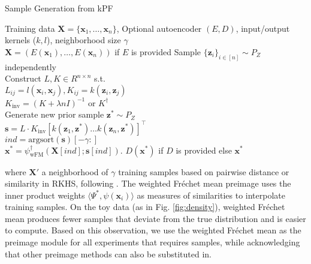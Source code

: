 \begin{wraptable}{r}{0.5\textwidth}
    \vspace{-2em}
    \begin{minipage}{0.5\textwidth}
        \begin{algorithm}[H]
        \footnotesize
        \caption{Sample Generation from kPF}
        \label{alg:gen_algo}
        \begin{algorithmic}[1]
        
            Training data $\mathbf{X} = \{\mathbf{x}_1, \dots, \mathbf{x}_n\}$, Optional autoencoder $(E, D)$, input/output kernels ($k, l$), neighborhood size $\gamma$\\
          \STATE \quad $\mathbf{X} = \left(E\left(\mathbf{x}_1\right), \dots, E\left(\mathbf{x}_n\right)\right)$ if $E$ is provided
          \STATE \quad Sample $\{\mathbf{z}_i\}_{i \in [n]} \sim P_Z$ independently \\
          \STATE \quad Construct $L, K \in R^{n \times n}$ s.t.\\
                 \qquad $L_{ij} = l(\mathbf{x}_i, \mathbf{x}_j), K_{ij} = k\left(\mathbf{z}_i, \mathbf{z}_j\right)$\\
          \STATE \quad $K_{\textrm{inv}} = (K + \lambda n I)^{-1}$ or $K^{\dagger}$\\
          \STATE \quad Generate new prior sample $\mathbf{z}^* \sim P_Z$\\
          \STATE \quad$\mathbf{s} = L\cdot K_{\textrm{inv}}[k(\mathbf{z}_1, \mathbf{z}^*) \dots k(\mathbf{z}_n, \mathbf{z}^*)]^\top$\\
          \STATE \quad $ind = \textrm{argsort}(\mathbf{s})[-\gamma:]$\\
        
          \STATE \quad$\mathbf{x}^* = \psi_{\textrm{wFM}}^{\dagger}\left(\mathbf{X}[ind]; \mathbf{s}[ind] \right)$.
           $D(\mathbf{x}^*)$ if $D$ is provided else $\mathbf{x}^*$
        \end{algorithmic}
        \end{algorithm}
    \end{minipage}
    \vspace{-1em}
\end{wraptable}
where $\mathbf{X}'$ a neighborhood of $\gamma$ training samples based on pairwise distance or similarity in RKHS, following \citep{kwok2004pre}. The weighted Fr\'{e}chet mean preimage uses the inner product weights $\langle \Psi^*, \psi(\mathbf{x}_i) \rangle$ as measures of similarities to interpolate training samples. On the toy data (as in Fig. \ref{fig:density}), weighted Fr\'{e}chet mean produces fewer samples that deviate from the true distribution and is easier to compute. Based on this observation, we use the weighted Fr\'{e}chet mean as the preimage module for all experiments that requires samples, while acknowledging that other preimage methods can also be substituted in.

